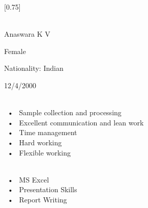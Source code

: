 \documentclass[lighthipster]{simplehipstercv}
\begin{document}
\setlength{\columnsep}{1.5cm}
[0.75]
\begin{paracol}{2}

\paracolbackgroundoptions



\footnotesize
{\setasidefontcolour
\flushright
\begin{center}
\end{center}

\vspace{1cm}


 \\[0.5em]
Anaswara K V

Female

Nationality: Indian

12/4/2000

\bigskip

\vspace{2cm}

 \\[0.5em]

 ~•~ Sample collection and processing \\ ~•~ Excellent communication and lean work \\
 
  ~•~ Time management \\~•~ Hard working \\~•~ Flexible working

\bigskip
\vspace{2cm}
 \\[0.5em]

 ~•~ MS Excel\\ ~•~ Presentation Skills \\
 
  ~•~ Report Writing 

\bigskip







}
\end{paracol}
\end{document}
